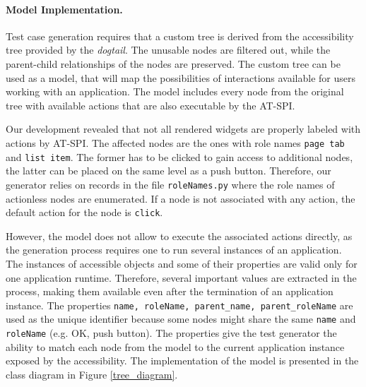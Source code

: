 \paragraph{Model Implementation.} Test case generation requires that a custom tree is derived from the accessibility tree provided by the \textit{dogtail}. The unusable nodes are filtered out, while the parent-child relationships of the nodes are preserved. The custom tree can be used as a model, that will map the possibilities of interactions available for users working with an application. The model includes every node from the original tree with available actions that are also executable by the AT-SPI.

Our development revealed that not all rendered widgets are properly labeled with actions by AT-SPI. The affected nodes are the ones with role names \texttt{page tab} and \texttt{list item}. The former has to be clicked to gain access to additional nodes, the latter can be placed on the same level as a push button. Therefore, our generator relies on records in the file \texttt{roleNames.py} where the role names of actionless nodes are enumerated. If a node is not associated with any action, the default action for the node is \texttt{click}.

However, the model does not allow to execute the associated actions directly, as the generation process requires one to run several instances of an application. The instances of accessible objects and some of their properties are valid only for one application runtime. Therefore, several important values are extracted in the process, making them available even after the termination of an application instance. The properties \texttt{name, roleName, parent\_name, parent\_roleName} are used as the unique identifier because some nodes might share the same \texttt{name} and \texttt{roleName} (e.g. OK, push button). The properties give the test generator the ability to match each node from the model to the current application instance exposed by the accessibility. The implementation of the model is presented in the class diagram in Figure \ref{tree_diagram}.

